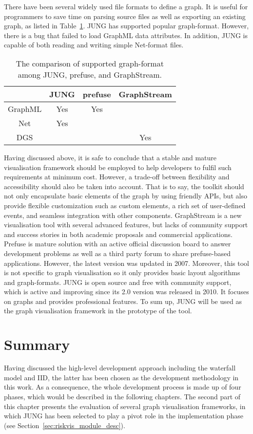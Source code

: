 There have been several widely used file formats to define a graph. It is useful for programmers to save time on parsing source files as well as exporting an existing graph, as listed in Table~\ref{tab:03_03}. JUNG has supported popular graph-format. However, there is a bug that failed to load GraphML data attributes. In addition, JUNG is capable of both reading and writing simple Net-format files. 

\begin{table}
	\centering
		\begin{tabular}{ | c | c | c | c |}
		\hline    
		 & JUNG & prefuse & GraphStream\\ \hline
GraphML & Yes & Yes & \\ \hline
Net  & Yes &  & \\ \hline
DGS &  &  & Yes \\
\hline
		\end{tabular}
	\caption{The comparison of supported graph-format among JUNG, prefuse, and GraphStream.}
	\label{tab:03_03}
\end{table}

Having discussed above, it is safe to conclude that a stable and mature visualisation framework should be employed to help developers to fulfil such requirements at minimum cost. However, a trade-off between flexibility and accessibility should also be taken into account. That is to say, the toolkit should not only encapsulate basic elements of the graph by using friendly APIs, but also provide flexible customization such as custom elements, a rich set of user-defined events, and seamless integration with other components. GraphStream is a new visualisation tool with several advanced features, but lacks of community support and success stories in both academic proposals and commercial applications. Prefuse is mature solution with an active official discussion board to answer development problems as well as a third party forum to share prefuse-based applications. However, the latest version was updated in 2007. Moreover, this tool is not specific to graph visualisation so it only provides basic layout algorithms and graph-formats. JUNG is open source and free with community support, which is active and improving since its 2.0 version was released in 2010. It focuses on graphs and provides professional features. To sum up, JUNG will be used as the graph visualisation framework in the prototype of the tool.

\section{Summary}

Having discussed the high-level development approach including the waterfall model and IID, the latter has been chosen as the development methodology in this work. As a consequence, the whole development process is made up of four phases, which would be described in the following chapters. The second part of this chapter presents the evaluation of several graph visualisation frameworks, in which JUNG has been selected to play a pivot role in the implementation phase (see Section~\ref{sec:riskvis_module_desc}).
